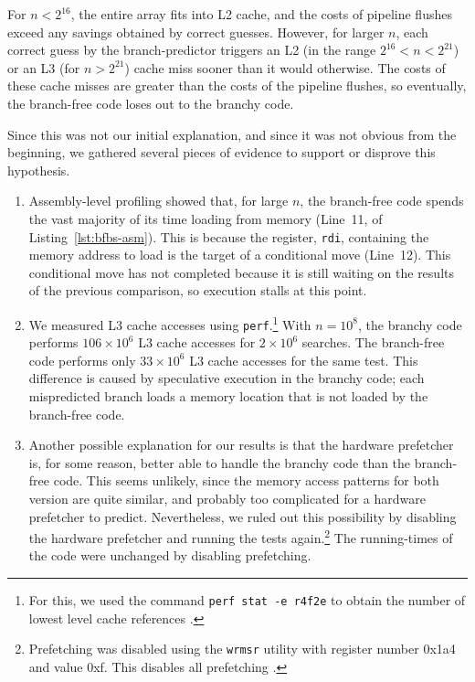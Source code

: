 \documentclass{patmorin}
\newcommand{\lstref}[1]{Listing~\ref{lst:#1}}
\begin{document}
For $n<2^{16}$, the entire array fits into L2 cache, and the costs
of pipeline flushes exceed any savings obtained by correct guesses.
However, for larger $n$, each correct guess by the branch-predictor
triggers an L2 (in the range $2^{16}<n<2^{21}$) or an L3 (for $n>2^{21}$)
cache miss sooner than it would otherwise.  The costs of these cache
misses are greater than the costs of the pipeline flushes, so eventually,
the branch-free code loses out to the branchy code.

Since this was not our initial explanation, and since it was not obvious
from the beginning, we gathered several pieces of evidence to support
or disprove this hypothesis.

\begin{enumerate}
\item Assembly-level profiling showed that, for large $n$, the
  branch-free code spends the vast majority of its time loading from
  memory (Line~11, of \lstref{bfbs-asm}).  This is because the register,
  \texttt{rdi},  containing the memory address to load is the
  target of a conditional move (Line~12).  This conditional move has not
  completed because it is still waiting on the results of the previous
  comparison, so execution stalls at this point.

\item We measured L3 cache accesses using
   \texttt{perf}.\footnote{For this, we used the command
   \texttt{perf stat -e r4f2e} to obtain the number of lowest
   level cache references \cite[Table~18-1]{intel:system}.} With $n=10^8$,
   the branchy code performs $106\times 10^6$ L3 cache accesses for
   $2\times 10^6$ searches.  The branch-free code performs only $33\times
   10^6$ L3 cache accesses for the same test. This difference is caused
   by speculative execution in the branchy code; each mispredicted branch
   loads a memory location that is not loaded by the branch-free code.

\item Another possible explanation for our results is that the hardware
   prefetcher is, for some reason, better able to handle the branchy
   code than the branch-free code.  This seems unlikely, since the memory
   access patterns for both version are quite similar, and probably too
   complicated for a hardware prefetcher to predict. Nevertheless, we
   ruled out this possibility by disabling the hardware prefetcher and
   running the tests again.\footnote{Prefetching was disabled using the
   \texttt{wrmsr} utility with register number 0x1a4 and
   value 0xf.  This disables all prefetching \cite{intel:optimizing}.}
   The running-times of the code were unchanged by disabling prefetching.


\end{enumerate}
\end{document}
